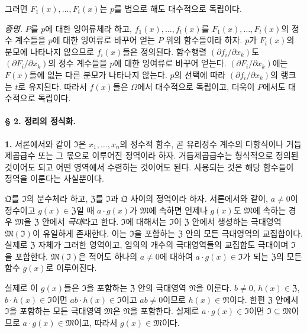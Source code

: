 그러면 \(F_1(x),\ldots,F_t(x)\)는 \(p\)를 법으로 해도 대수적으로 독립이다.

\emph{증명.}
\(P\)를 \(p\)에 대한 잉여류체라 하고, \(f_1(x),\ldots,f_t(x)\)를 \(F_1(x),\ldots,F_t(x)\)의 정수 계수들을 \(p\)에 대한 잉여류로 바꾸어 얻는 \(P\) 위의 함수들이라 하자. \(p\)가 \(F_i(x)\)의 분모에 나타나지 않으므로 \(f_i(x)\)들은 정의된다. 함수행렬 \((\partial f_i/\partial x_k)\)도 \((\partial F_i/\partial x_k)\)의 정수 계수들을 \(p\)에 대한 잉여류로 바꾸어 얻는다. \((\partial F_i/\partial x_k)\)에는 \(F(x)\)들에 없는 다른 분모가 나타나지 않는다. \(p\)의 선택에 따라 \((\partial f_i/\partial x_k)\)의 랭크는 \(t\)로 유지된다. 따라서 \(f(x)\)들은 \(\Omega\)에서 대수적으로 독립이고, 더욱이 \(P\)에서도 대수적으로 독립이다.

\bigskip
\paragraph{§ 2. 정리의 정식화.}

\textbf{1.}
서론에서와 같이 \(\mathfrak I\)은 \(x_1,\ldots,x_n\)의 정수적 함수, 곧 유리정수 계수의 다항식이나 거듭제곱급수 또는 그 몫으로 이루어진 정역이라 하자. 거듭제곱급수는 형식적으로 정의된 것이어도 되고 어떤 영역에서 수렴하는 것이어도 된다. 사용되는 것은 해당 함수들이 정역을 이룬다는 사실뿐이다.

\(\mathfrak Q\)를 \(\mathfrak I\)의 분수체라 하고, \(\mathfrak Z\)를 \(\mathfrak I\)과 \(\mathfrak Q\) 사이의 정역이라 하자. 서론에서와 같이, \(a\ne0\)이 정수이고 \(g(x)\in\mathfrak Z\)일 때 \(a\cdot g(x)\)가 \(\mathfrak M\)에 속하면 언제나 \(g(x)\)도 \(\mathfrak M\)에 속하는 경우 \(\mathfrak M\)을 \(\mathfrak Z\) 안에서 \emph{극대}라고 한다. \(\mathfrak I\)에 대해서는 \(\mathfrak I\)이 \(\mathfrak Z\) 안에서 생성하는 극대영역 \(\mathfrak M(\mathfrak I)\)이 유일하게 존재한다. 이는 \(\mathfrak I\)을 포함하는 \(\mathfrak Z\) 안의 모든 극대영역의 교집합이다. 실제로 \(\mathfrak Z\) 자체가 그러한 영역이고, 임의의 개수의 극대영역들의 교집합도 극대이며 \(\mathfrak I\)을 포함한다. \(\mathfrak M(\mathfrak I)\)은 적어도 하나의 \(a\ne0\)에 대하여 \(a\cdot g(x)\in\mathfrak I\)가 되는 \(\mathfrak Z\)의 모든 함수 \(g(x)\)로 이루어진다.

실제로 이 \(g(x)\)들은 \(\mathfrak I\)을 포함하는 \(\mathfrak Z\) 안의 극대영역 \(\mathfrak N\)을 이룬다. \(b\ne0\), \(h(x)\in\mathfrak Z\), \(b\cdot h(x)\in\mathfrak I\)이면 \(ab\cdot h(x)\in\mathfrak I\)이고 \(ab\ne0\)이므로 \(h(x)\in\mathfrak N\)이다. 한편 \(\mathfrak Z\) 안에서 \(\mathfrak I\)을 포함하는 모든 극대영역 \(\mathfrak M\)은 \(\mathfrak N\)을 포함한다. 실제로 \(a\cdot g(x)\in\mathfrak I\)이면 \(\mathfrak I\subseteq\mathfrak M\)이므로 \(a\cdot g(x)\in\mathfrak M\)이고, 따라서 \(g(x)\in\mathfrak M\)이다.

